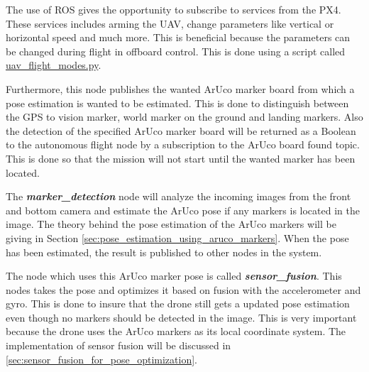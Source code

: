 \documentclass[../Head/report.tex]{subfiles}
\begin{document}
The use of ROS gives the opportunity to subscribe to services from the PX4. These services includes arming the UAV, change parameters like vertical or horizontal speed and much more. This is beneficial because the parameters can be changed during flight in offboard control. This is done using a script called \href{https://github.com/Kenil16/master\_project/blob/master/software/ros\_workspace/src/offboard\_control/uav\_flight\_modes.py}{uav\_flight\_modes.py}. 	

Furthermore, this node publishes the wanted ArUco marker board from which a pose estimation is wanted to be estimated. This is done to distinguish between the GPS to vision marker, world marker on the ground and landing markers. Also the detection of the specified ArUco marker board will be returned as a Boolean to the autonomous flight node by a subscription to the ArUco board found topic. This is done so that the mission will not start until the wanted marker has been located.  

The \textit{\textbf{marker\_detection}} node will analyze the incoming images from the front and bottom camera and estimate the ArUco pose if any markers is located in the image. The theory behind the pose estimation of the ArUco markers will be giving in Section \ref{sec:pose_estimation_using_aruco_markers}. When the pose has been estimated, the result is published to other nodes in the system.

The node which uses this ArUco marker pose is called \textit{\textbf{sensor\_fusion}}. This nodes takes the pose and optimizes it based on fusion with the accelerometer and gyro. This is done to insure that the drone still gets a updated pose estimation even though no markers should be detected in the image. This is very important because the drone uses the ArUco markers as its local coordinate system. The implementation of sensor fusion will be discussed in \ref{sec:sensor_fusion_for_pose_optimization}.  


\end{document}
